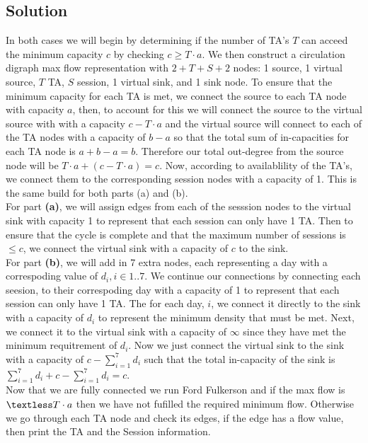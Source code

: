 \documentclass[12pt]{article}
\begin{document}
\subsection{Solution}
\indent In both cases we will begin by determining if the number of TA's $T$ can acceed the minimum capacity
$c$ by checking $c \geq T\cdot a$. We then construct a circulation digraph max flow 
representation with $2 + T + S + 2$ nodes: 1 source, 1 virtual source, $T$ TA, $S$ session, 1 virtual 
sink, and 1 sink node. To ensure that the minimum capacity for each TA is met, we connect the source to each
TA node with capacity $a$, then, to account for this we will connect the source to the virtual source
with with a capacity $c-T\cdot a$ and the virtual source will connect to each of the TA nodes with a
capacity of $b-a$ so that the total sum of in-capacities for each TA node is $a + b - a = b$. Therefore
our total out-degree from the source node will be $T\cdot a + (c - T\cdot a) = c$. Now, according to 
availablility of the TA's, we connect them to the corresponding session nodes with a capacity of 1. This 
is the same build for both parts (a) and (b). \\  

\indent For part \textbf{(a)}, we will assign edges from each of the sesssion nodes to
the virtual sink with capacity 1 to represent that each session can only have 1 TA. Then to ensure that
the cycle is complete and that the maximum number of sessions is $\leq c$, we connect the virtual sink
with a capacity of $c$ to the sink. \\

\indent For part \textbf{(b)}, we will add in 7 extra nodes, each representing a day with a correspoding
value of $d_i, i \in 1..7$. We continue our connections by connecting each seesion, to their correspoding
day with a capacity of 1 to represent that each session can only have 1 TA. The for each day, $i$, we connect
it directly to the sink with a capacity of $d_i$ to represent the minimum density that must be met. Next, we 
connect it to the virtual sink with a capacity of $\infty$ since they have met the minimum requitrement of $d_i$.
Now we just connect the virtual sink to the sink with a capacity of $c - \sum_{i = 1}^7 d_i$ such that the
total in-capacity of the sink is  $\sum_{i = 1}^7 d_i + c - \sum_{i = 1}^{7} d_i = c$. \\

\indent Now that we are fully connected we run Ford Fulkerson and if the max flow is $\textless T\cdot a$ then we have
not fufilled the required minimum flow. Otherwise we go through each TA node and check its edges, if the 
edge has a flow value, then print the TA and the Session information.  \\
\end{document}
